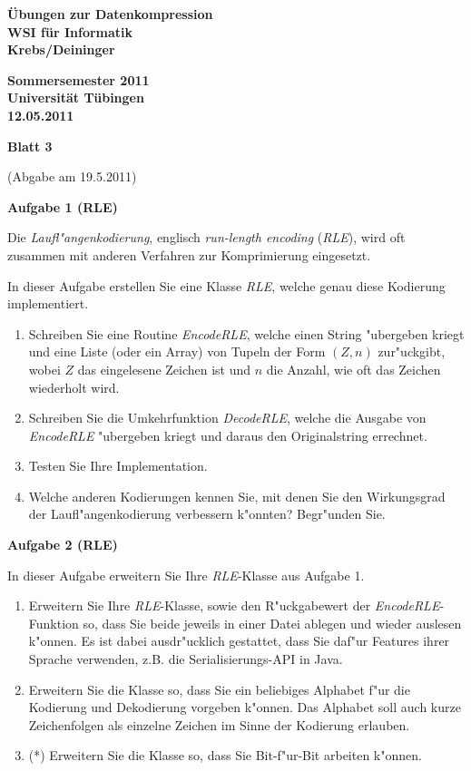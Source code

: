 \documentclass[a4paper]{article}
\def\header#1#2#3#4{\pagestyle{empty}
\noindent
\begin{minipage}[t]{0.6\textwidth}
\begin{flushleft}
\bf \"Ubungen zur Datenkompression\\
WSI f\"ur Informatik\\
Krebs/Deininger
\end{flushleft}
\end{minipage}
\begin{minipage}[t]{0.4\textwidth}
\begin{flushright}
\bf Sommersemester 2011\\
Universit\"at T\"ubingen\\
#2 %
\end{flushright}
\end{minipage}

\begin{center}
{\Large\bf Blatt #1}

{(Abgabe am #3)}
\end{center}
}
\begin{document}
\header{3}{12.05.2011}{19.5.2011}{}

\bigskip

{\bf Aufgabe 1  \quad(RLE) }

Die {\em Laufl"angenkodierung}, englisch {\em run-length encoding} ({\em RLE}),
wird oft zusammen mit anderen Verfahren zur Komprimierung eingesetzt.

In dieser Aufgabe erstellen Sie eine Klasse {\em RLE}, welche genau diese
Kodierung implementiert.

\begin{enumerate}
\item Schreiben Sie eine Routine {\em EncodeRLE}, welche einen String "ubergeben
      kriegt und eine Liste (oder ein Array) von Tupeln der Form $(Z,n)$
      zur"uckgibt, wobei $Z$ das eingelesene Zeichen ist und $n$ die Anzahl, wie
      oft das Zeichen wiederholt wird.
\item Schreiben Sie die Umkehrfunktion {\em DecodeRLE}, welche die Ausgabe von
      {\em EncodeRLE} "ubergeben kriegt und daraus den Originalstring errechnet.
\item Testen Sie Ihre Implementation.
\item Welche anderen Kodierungen kennen Sie, mit denen Sie den Wirkungsgrad der
      Laufl"angenkodierung verbessern k"onnten? Begr"unden Sie.
\end{enumerate}

\bigskip

{\bf Aufgabe 2  \quad(RLE)}

In dieser Aufgabe erweitern Sie Ihre {\em RLE}-Klasse aus Aufgabe 1.

\begin{enumerate}
\item Erweitern Sie Ihre {\em RLE}-Klasse, sowie den R"uckgabewert der
      {\em EncodeRLE}-Funktion so, dass Sie beide jeweils in einer Datei ablegen
      und wieder auslesen k"onnen. Es ist dabei ausdr"ucklich gestattet, dass
      Sie daf"ur Features ihrer Sprache verwenden, z.B. die Serialisierungs-API
      in Java.
\item Erweitern Sie die Klasse so, dass Sie ein beliebiges Alphabet f"ur die
      Kodierung und Dekodierung vorgeben k"onnen. Das Alphabet soll auch
      kurze Zeichenfolgen als einzelne Zeichen im Sinne der Kodierung erlauben.
\item(*) Erweitern Sie die Klasse so, dass Sie Bit-f"ur-Bit arbeiten k"onnen.
\end{enumerate}

\bigskip
\end{document}
